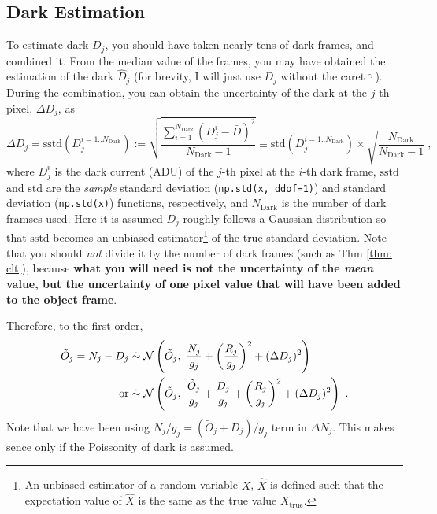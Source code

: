 \subsection{Dark Estimation}
To estimate dark $ D_j $, you should have taken nearly tens of dark frames, and combined it. From the median value of the frames, you may have obtained the estimation of the dark $ \hat{D}_j $ (for brevity, I will just use $ D_j $ without the caret $ \hat{\cdot} $). During the combination, you can obtain the uncertainty of the dark at the $ j $-th pixel, $ \Delta D_j $, as
\begin{equation}
  \Delta D_j = \mathrm{sstd} (D_j^{i=1..N_\mathrm{Dark}}) 
    := \sqrt{ \frac{\sum_{i=1}^{N_\mathrm{Dark}} (D_j^{i} - \bar{D})^2}
      {N_\mathrm{Dark} - 1}} 
    \equiv \mathrm{std}(D_j^{i=1..N_\mathrm{Dark}}) 
      \times \sqrt{\frac{N_\mathrm{Dark}}{N_\mathrm{Dark} - 1}} ~,
\end{equation}
where $ D_j^{i} $ is the dark current (ADU) of the $ j $-th pixel at the $ i $-th dark frame, $ \mathrm{sstd} $ and $ \mathrm{std} $ are the \textit{sample} standard deviation (\texttt{np.std(x, ddof=1)}) and standard deviation (\texttt{np.std(x)}) functions, respectively, and $ N_\mathrm{Dark} $ is the number of dark framses used. Here it is assumed $ D_j $ roughly follows a Gaussian distribution so that $ \mathrm{sstd} $ becomes an unbiased estimator\footnote{An unbiased estimator of a random variable $ X $, $ \hat{X} $ is defined such that the expectation value of $ \hat{X} $ is the same as the true value $ X_\mathrm{true} $.} of the true standard deviation. Note that you should \emph{not} divide it by the number of dark frames (such as Thm \ref{thm: clt}), because \textbf{what you will need is not the uncertainty of the \emph{mean} value, but the uncertainty of one pixel value that will have been added to the object frame}. 

Therefore, to the first order,
\begin{equation}
\begin{aligned}
  \tilde{O}_j = N_j - D_j 
    &\mathrel{\dot{\sim}} \mathcal{N} 
      \left ( \tilde{O}_j,~ 
        \frac{N_j}{g_j} + \left (\frac{R_j}{g_j} \right )^2 + (\Delta D_j)^2 \right ) \\
  \mathrm{or}
    &\mathrel{\dot{\sim}} \mathcal{N} 
        \left ( \tilde{O}_j,~ 
          \frac{\tilde{O}_j}{g_j} 
          + \frac{D_j}{g_j} 
          + \left (\frac{R_j}{g_j} \right )^2 
          + (\Delta D_j)^2 \right ) ~.
\end{aligned}
\end{equation}
Note that we have been using $ N_j/g_j = (\tilde{O}_j + D_j)/g_j $ term in $ \Delta N_j $. This makes sence only if the Poissonity of dark is assumed.

